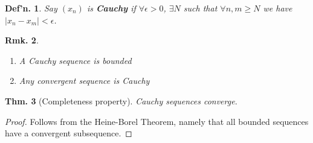 \documentclass[12pt, a4paper]{book}
\newtheorem{theorem}{Thm.}[section]
\newtheorem{definition}[theorem]{Def'n.}
\newtheorem{remark}[theorem]{Rmk.}
\theoremstyle{nonumberplain}
\newtheorem{proof}{Proof}
\begin{document}
\begin{definition}
    Say $(x_n)$ is \textbf{Cauchy} if $\forall\epsilon>0$, $\exists N$ such that $\forall n,m\geq N$ we have
    $|x_n-x_m|<\epsilon$.
\end{definition}
\begin{remark}\hspace{1cm}
    \begin{enumerate}
        \item A Cauchy sequence is bounded
        \item Any convergent sequence is Cauchy
    \end{enumerate}
\end{remark}
\begin{theorem}[Completeness property]
    Cauchy sequences converge.
\end{theorem}
\begin{proof}
    Follows from the Heine-Borel Theorem, namely that all bounded sequences have a convergent subsequence.
\end{proof}
\end{document}
